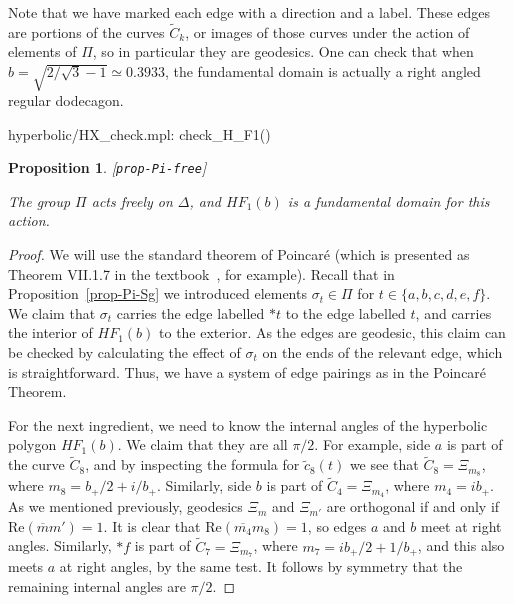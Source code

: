 \documentclass[reqno]{amsart}
\newcommand{\lbl}[1]{\label{#1}\textup{[\texttt{#1}]}\par}
\newcommand{\lbl}{\label}
\newcommand{\Dl}        {\Delta}
\newcommand{\sg}        {\sigma}
\newcommand{\ov}[1]     {\overline{#1}}
\newcommand{\tC}	{\widetilde{C}}
\newcommand{\tc}	{\widetilde{c}}
\renewcommand{\:}{\colon}
\newtheorem{proposition}[theorem]{Proposition}
\theoremstyle{definition}
\begin{document}
Note that we have marked each edge with a direction and a label.
These edges are portions of the curves $\tC_k$, or images of those
curves under the action of elements of $\Pi$, so in particular they
are geodesics.  One can check that when
$b=\sqrt{2/\sqrt{3}-1}\simeq 0.3933$, the fundamental domain is
actually a right angled regular dodecagon.
\begin{checks}
 hyperbolic/HX_check.mpl: check_H_F1()
\end{checks}

\begin{proposition}\lbl{prop-Pi-free}
 The group $\Pi$ acts freely on $\Dl$, and $HF_1(b)$ is a fundamental
 domain for this action.
\end{proposition}
\begin{proof}
 We will use the standard theorem of Poincar\'e (which is presented as
 Theorem VII.1.7 in the textbook~\cite{iv:hg}, for example).
 Recall that in Proposition~\ref{prop-Pi-Sg} we introduced elements
 $\sg_t\in\Pi$ for $t\in\{a,b,c,d,e,f\}$.  We claim that $\sg_t$
 carries the edge labelled $*t$ to the edge labelled $t$, and carries
 the interior of $HF_1(b)$ to the exterior.  As the edges are geodesic,
 this claim can be checked by calculating the effect of $\sg_t$ on the
 ends of the relevant edge, which is straightforward.  Thus, we have a
 system of edge pairings as in the Poincar\'e Theorem.

 For the next ingredient, we need to know the internal angles of the
 hyperbolic polygon $HF_1(b)$.  We claim that they are all $\pi/2$.  For
 example, side $a$ is part of the curve $\tC_8$, and by inspecting the
 formula for $\tc_8(t)$ we see that $\tC_8=\Xi_{m_8}$, where
 $m_8=b_+/2+i/b_+$.  Similarly, side $b$ is part of $\tC_4=\Xi_{m_4}$,
 where $m_4=ib_+$.  As we mentioned previously, geodesics $\Xi_m$ and
 $\Xi_{m'}$ are orthogonal if and only if $\text{Re}(\ov{m}m')=1$.  It
 is clear  that $\text{Re}(\ov{m_4}m_8)=1$, so edges $a$ and $b$ meet
 at right angles.  Similarly, $*f$ is part of $\tC_7=\Xi_{m_7}$, where
 $m_7=ib_+/2+1/b_+$, and this also meets $a$ at right angles, by the same
 test.  It follows by symmetry that the remaining internal angles are
 $\pi/2$.


\end{proof}
\end{document}
